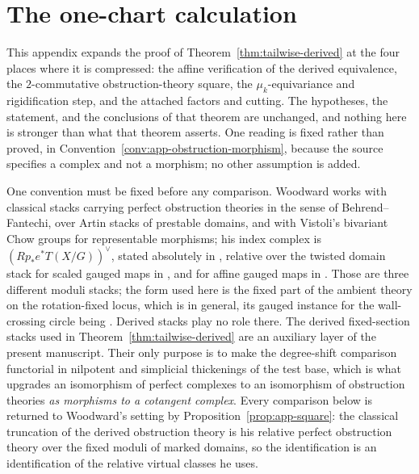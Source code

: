 \section{The one-chart calculation}
\label{app:one-chart}

This appendix expands the proof of Theorem~\ref{thm:tailwise-derived} at the
four places where it is compressed: the affine verification of the derived
equivalence, the \(2\)-commutative obstruction-theory square, the
\(\mu_k\)-equivariance and rigidification step, and the attached factors and
cutting.  The hypotheses, the statement,
and the conclusions of that theorem are unchanged, and nothing here is
stronger than what that theorem asserts.  One reading is fixed rather than
proved, in Convention~\ref{conv:app-obstruction-morphism}, because the source
specifies a complex and not a morphism; no other assumption is added.

One convention must be fixed before any comparison.  Woodward works with
classical stacks carrying perfect obstruction theories in the sense of
Behrend--Fantechi, over Artin stacks of prestable domains, and with Vistoli's
bivariant Chow groups for representable morphisms; his index complex is
\((Rp_*e^*T(X/G))^\vee\), stated absolutely in
\cite[Definition~7.13(a)]{WoodwardQKIII}, relative over the twisted domain
stack for scaled gauged maps in \cite[Section~8.3]{WoodwardQKIII}, and for
affine gauged maps in \cite[Example~6.6(c)]{WoodwardQKII}.  Those are three
different moduli stacks; the form used here is the fixed part of the ambient
theory on the rotation-fixed locus, which is
\cite{GraberPandharipande} in general, its gauged instance for the
wall-crossing circle being \cite[Corollary~3.20]{GonzalezWoodward}.
Derived stacks play no role there.  The
derived fixed-section stacks used in Theorem~\ref{thm:tailwise-derived} are an
auxiliary layer of the present manuscript.  Their only purpose is to make the
degree-shift comparison functorial in nilpotent and simplicial thickenings of
the test base, which is what upgrades an isomorphism of perfect complexes to an
isomorphism of obstruction theories \emph{as morphisms to a cotangent complex}.
Every comparison below is returned to Woodward's setting by
Proposition~\ref{prop:app-square}: the classical truncation of the derived
obstruction theory is his relative perfect obstruction theory over the fixed
moduli of marked domains, so the identification is an identification of the
relative virtual classes he uses.

